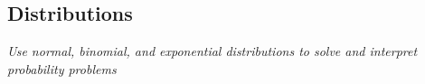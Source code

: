 \subsection[distributions]{Distributions}

\textit{Use normal, binomial, and exponential distributions to solve and interpret probability problems}